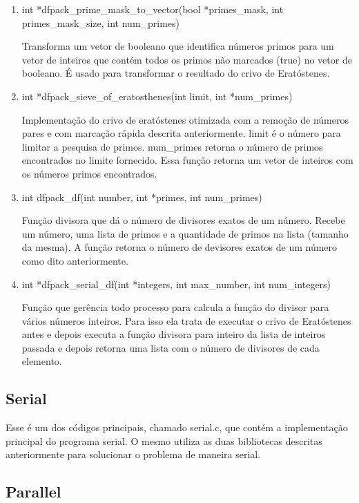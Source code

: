 \documentclass{article}
\begin{document}
\begin{enumerate}
    \item int *dfpack\_prime\_mask\_to\_vector(bool *primes\_mask, int primes\_mask\_size, int num\_primes)

	Transforma um vetor de booleano que identifica números primos para um vetor de inteiros que contém todos os primos não marcados (true) no vetor de booleano. É usado para transformar o resultado do crivo de Eratóstenes.

    \item int *dfpack\_sieve\_of\_eratosthenes(int limit, int *num\_primes)

	Implementação do crivo de eratóstenes otimizada com a remoção de números pares e com marcação rápida descrita anteriormente. limit é o número para limitar a pesquisa de primos. num\_primes retorna o número de primos encontrados no limite fornecido. Essa função retorna um vetor de inteiros com os números primos encontrados.
    \item int dfpack\_df(int number, int *primes, int num\_primes)

	Função divisora que dá o número de divisores exatos de um número. Recebe um número, uma lista de primos e a quantidade de primos na lista (tamanho da mesma). A função retorna o número de devisores exatos de um número como dito anteriormente.

    \item int *dfpack\_serial\_df(int *integers, int max\_number, int num\_integers)

	Função que gerência todo processo para calcula a função do divisor para vários números inteiros. Para isso ela trata de executar o crivo de Eratóstenes antes e depois executa a função divisora para inteiro da lista de inteiros passada e depois retorna uma lista com o número de divisores de cada elemento.

\end{enumerate}

\subsection{Serial}

Esse é um dos códigos principais, chamado serial.c, que contém a implementação principal do programa serial. O mesmo utiliza as duas bibliotecas descritas anteriormente para solucionar o problema de maneira serial.


\subsection{Parallel}
\end{document}
